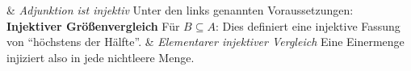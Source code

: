 \begin{BandUebersicht}
&
\textit{Adjunktion ist injektiv}
Unter den links genannten Voraussetzungen:
\\
\addlinespace[.8ex]
\textbf{Injektiver Größenvergleich}
Für \(B\subseteq A\):
Dies definiert eine injektive Fassung von \enquote{höchstens der Hälfte}.
&
\textit{Elementarer injektiver Vergleich}
Eine Einermenge injiziert also in jede nichtleere Menge.
\\
\end{BandUebersicht}
